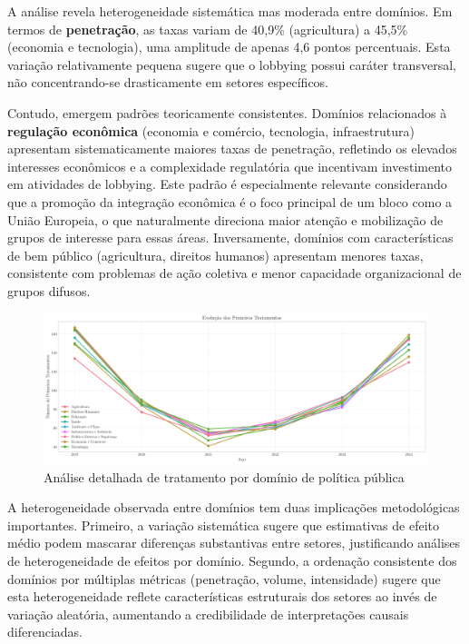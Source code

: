 A análise revela heterogeneidade sistemática mas moderada entre domínios. Em termos de \textbf{penetração}, as taxas variam de 40,9\% (agricultura) a 45,5\% (economia e tecnologia), uma amplitude de apenas 4,6 pontos percentuais. Esta variação relativamente pequena sugere que o lobbying possui caráter transversal, não concentrando-se drasticamente em setores específicos.

Contudo, emergem padrões teoricamente consistentes. Domínios relacionados à \textbf{regulação econômica} (economia e comércio, tecnologia, infraestrutura) apresentam sistematicamente maiores taxas de penetração, refletindo os elevados interesses econômicos e a complexidade regulatória que incentivam investimento em atividades de lobbying. Este padrão é especialmente relevante considerando que a promoção da integração econômica é o foco principal de um bloco como a União Europeia, o que naturalmente direciona maior atenção e mobilização de grupos de interesse para essas áreas. Inversamente, domínios com características de bem público (agricultura, direitos humanos) apresentam menores taxas, consistente com problemas de ação coletiva e menor capacidade organizacional de grupos difusos.


\begin{figure}[htbp]
    \centering
    \includegraphics[width=\textwidth]{figures/fig7_domain_treatment_analysis.pdf}
    \caption{Análise detalhada de tratamento por domínio de política pública}
    \label{fig:domain_treatment}
\end{figure}


A heterogeneidade observada entre domínios tem duas implicações metodológicas importantes. Primeiro, a variação sistemática sugere que estimativas de efeito médio podem mascarar diferenças substantivas entre setores, justificando análises de heterogeneidade de efeitos por domínio. Segundo, a ordenação consistente dos domínios por múltiplas métricas (penetração, volume, intensidade) sugere que esta heterogeneidade reflete características estruturais dos setores ao invés de variação aleatória, aumentando a credibilidade de interpretações causais diferenciadas.

